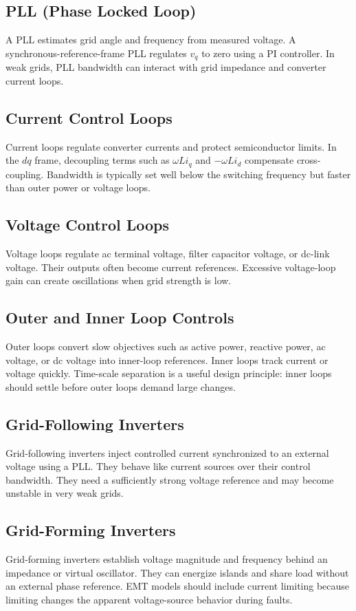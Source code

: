 \documentclass[11pt]{article}
\begin{document}
\subsection{PLL (Phase Locked Loop)}
A PLL estimates grid angle and frequency from measured voltage. A synchronous-reference-frame PLL regulates $v_q$ to zero using a PI controller. In weak grids, PLL bandwidth can interact with grid impedance and converter current loops.

\subsection{Current Control Loops}
Current loops regulate converter currents and protect semiconductor limits. In the $dq$ frame, decoupling terms such as $\omega L i_q$ and $-\omega L i_d$ compensate cross-coupling. Bandwidth is typically set well below the switching frequency but faster than outer power or voltage loops.

\subsection{Voltage Control Loops}
Voltage loops regulate ac terminal voltage, filter capacitor voltage, or dc-link voltage. Their outputs often become current references. Excessive voltage-loop gain can create oscillations when grid strength is low.

\subsection{Outer and Inner Loop Controls}
Outer loops convert slow objectives such as active power, reactive power, ac voltage, or dc voltage into inner-loop references. Inner loops track current or voltage quickly. Time-scale separation is a useful design principle: inner loops should settle before outer loops demand large changes.

\subsection{Grid-Following Inverters}
Grid-following inverters inject controlled current synchronized to an external voltage using a PLL. They behave like current sources over their control bandwidth. They need a sufficiently strong voltage reference and may become unstable in very weak grids.

\subsection{Grid-Forming Inverters}
Grid-forming inverters establish voltage magnitude and frequency behind an impedance or virtual oscillator. They can energize islands and share load without an external phase reference. EMT models should include current limiting because limiting changes the apparent voltage-source behavior during faults.
\end{document}
